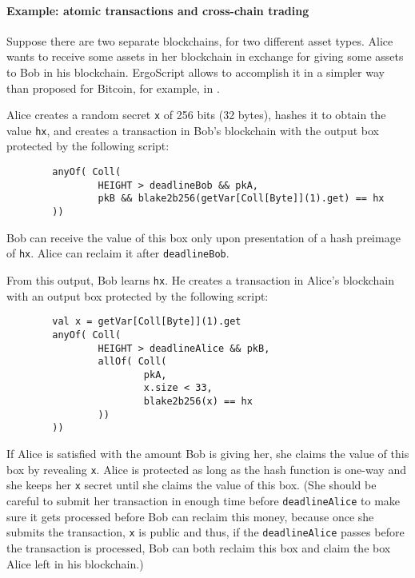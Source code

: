 \documentclass[11pt]{article}
\newcommand{\langname}{ErgoScript\xspace}
\begin{document}
\paragraph{Example: atomic transactions and cross-chain trading}
Suppose there are two separate blockchains, for two different asset types. Alice wants to receive some assets in her blockchain in exchange for giving some assets to Bob in his blockchain. \langname allows to accomplish it in a simpler way than proposed for Bitcoin, for example, in \cite{Nol13}.

Alice creates a random secret \texttt{x} of 256 bits (32 bytes), hashes it to obtain the value \texttt{hx}, and creates a transaction in Bob's blockchain with the output box protected by the following script:
\begin{verbatim}
        anyOf( Coll(
                HEIGHT > deadlineBob && pkA,
                pkB && blake2b256(getVar[Coll[Byte]](1).get) == hx
        ))
\end{verbatim}
Bob can receive the value of this box only upon presentation of a hash preimage of \texttt{hx}. Alice can reclaim it after \texttt{deadlineBob}.

From this output, Bob learns \texttt{hx}. He creates a transaction in Alice's blockchain with an output box protected by the following script:
\begin{verbatim}
        val x = getVar[Coll[Byte]](1).get
        anyOf( Coll(
                HEIGHT > deadlineAlice && pkB,
                allOf( Coll(
                        pkA,
                        x.size < 33,
                        blake2b256(x) == hx
                ))
        ))
\end{verbatim}

If Alice is satisfied with the amount Bob is giving her, she claims the value of this box by revealing \texttt{x}. Alice is protected as long as the hash function is one-way and she keeps her \texttt{x} secret until she claims the value of this box. (She should be careful to submit her transaction in enough time before \texttt{deadlineAlice} to make sure it gets processed before Bob can reclaim this money, because once she submits the transaction, \texttt{x} is public and thus, if the \texttt{deadlineAlice} passes before the transaction is processed, Bob can both reclaim this box and claim the box Alice left in his blockchain.)
\end{document}
